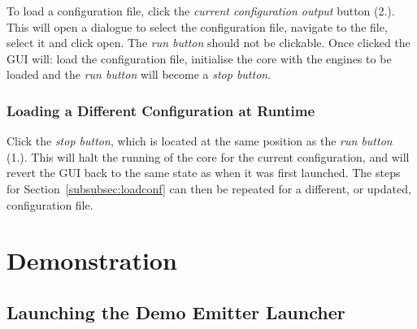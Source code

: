 \documentclass[10pt,a4paper]{article}
\begin{document}
To load a configuration file, click the \emph{current configuration output} button (2.). This will open a dialogue to select the configuration file, navigate to the file, select it and click open. The \emph{run button} should not be clickable. Once clicked the GUI will: load the configuration file, initialise the core with the engines to be loaded and the \emph{run button} will become a \emph{stop button}.

\subsubsection{Loading a Different Configuration at Runtime}

Click the \emph{stop button}, which is located at the same position as the \emph{run button} (1.). This will halt the running of the core for the current configuration, and will revert the GUI back to the same state as when it was first launched. The steps for Section~\ref{subsubsec:loadconf} can then be repeated for a different, or updated, configuration file.

\section{Demonstration}
\label{subsec:demo}
\subsection{Launching the Demo Emitter Launcher}
\end{document}
